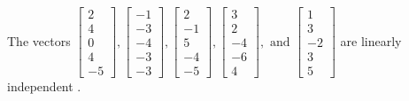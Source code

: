 \begin{exercise}
\begin{exerciseStatement}
  \end{exerciseStatement}
  \begin{exerciseAnswer}
   The vectors \(\left[\begin{array}{r}
2 \\
4 \\
0 \\
4 \\
-5
\end{array}\right] , \left[\begin{array}{r}
-1 \\
-3 \\
-4 \\
-3 \\
-3
\end{array}\right] , \left[\begin{array}{r}
2 \\
-1 \\
5 \\
-4 \\
-5
\end{array}\right] , \left[\begin{array}{r}
3 \\
2 \\
-4 \\
-6 \\
4
\end{array}\right] , \text{ and } \left[\begin{array}{r}
1 \\
3 \\
-2 \\
3 \\
5
\end{array}\right]\) are 
  	 linearly independent  .
  


  \end{exerciseAnswer}
\end{exercise}